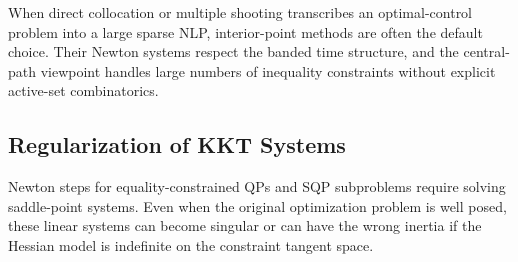 \begin{algorithm}[H]
	\DontPrintSemicolon
	\caption{Primal-Dual Interior-Point Method}
\label{alg:l3-primal-dual-interior-point-method}
\end{algorithm}

\begin{remark}
	When direct collocation or multiple shooting transcribes an optimal-control problem into a large sparse NLP, interior-point methods are often the default choice. Their Newton systems respect the banded time structure, and the central-path viewpoint handles large numbers of inequality constraints without explicit active-set combinatorics.
\end{remark}

\subsection{Regularization of KKT Systems}
\label{sec:l3-regularization-of-kkt-systems}

\begin{remark}
	Newton steps for equality-constrained QPs and SQP subproblems require solving saddle-point systems. Even when the original optimization problem is well posed, these linear systems can become singular or can have the wrong inertia if the Hessian model is indefinite on the constraint tangent space.
\end{remark}

